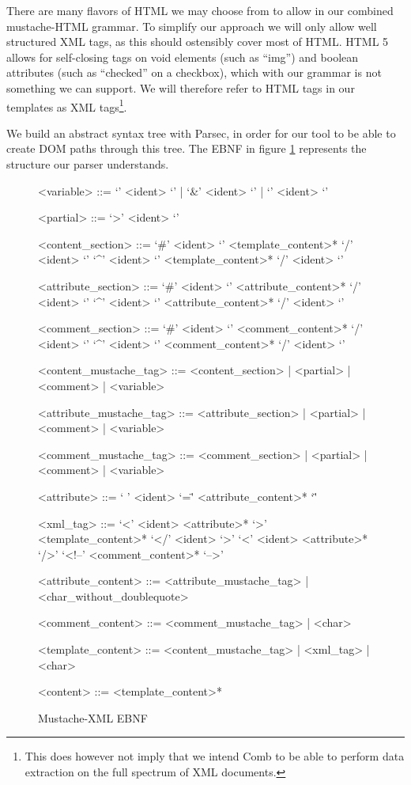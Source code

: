 \documentclass[thesis.tex]{subfiles}
\begin{document}
There are many flavors of HTML we may choose from to allow in our
combined mustache-HTML grammar. To simplify our approach we will only allow well
structured XML tags, as this should ostensibly cover most of HTML.
HTML 5 allows for self-closing tags on void elements (such as ``img'') and
boolean attributes (such as ``checked'' on a checkbox), which with our grammar
is not something we can support. We will therefore refer to HTML tags in our
templates as XML tags\footnote{This does however not imply that we intend Comb
to be able to perform data extraction on the full spectrum of XML documents.}.

We build an abstract syntax tree with Parsec, in order for our tool to be
able to create DOM paths through this tree.
The EBNF in figure \ref{fig:mustache-xml.ebnf} represents the structure our
parser understands.

\begin{figure}
	\centering
	\setlength{\grammarindent}{4.2cm}
	\begin{grammar}
<variable> ::= `{{{' <ident> `}}}' | `{{&' <ident> `}}' | `{{' <ident> `}}'

<partial> ::= `{{>' <ident> `}}'

<content\_section> ::= `{{#' <ident> `}}' <template\_content>* `{{/' <ident> `}}'
                  \alt `{{^' <ident> `}}' <template\_content>* `{{/' <ident> `}}'

<attribute\_section> ::= `{{#' <ident> `}}' <attribute\_content>* `{{/' <ident> `}}'
                    \alt `{{^' <ident> `}}' <attribute\_content>* `{{/' <ident> `}}'

<comment\_section> ::= `{{\#' <ident> `}}' <comment\_content>* `{{/' <ident> `}}'
                  \alt `{{^' <ident> `}}' <comment\_content>* `{{/' <ident> `}}'

<content\_mustache\_tag> ::= <content\_section> | <partial> | <comment> | <variable>

<attribute\_mustache\_tag> ::= <attribute\_section> | <partial> | <comment> | <variable>

<comment\_mustache\_tag> ::= <comment\_section> | <partial> | <comment> | <variable>

<attribute> ::= ` ' <ident> `=\"' <attribute\_content>* `\"' 

<xml\_tag> ::= `<' <ident> <attribute>* `>' <template\_content>* `</' <ident> `>'
          \alt `<' <ident> <attribute>* `/>'
          \alt `<!--' <comment\_content>* `-->'

<attribute\_content> ::= <attribute\_mustache\_tag> | <char\_without\_doublequote>

<comment\_content> ::= <comment\_mustache\_tag> | <char>

<template\_content> ::= <content\_mustache\_tag> | <xml\_tag> | <char>

<content> ::= <template\_content>*
	\end{grammar}
	\caption{Mustache-XML EBNF}
	\label{fig:mustache-xml.ebnf}
\end{figure}
\end{document}
